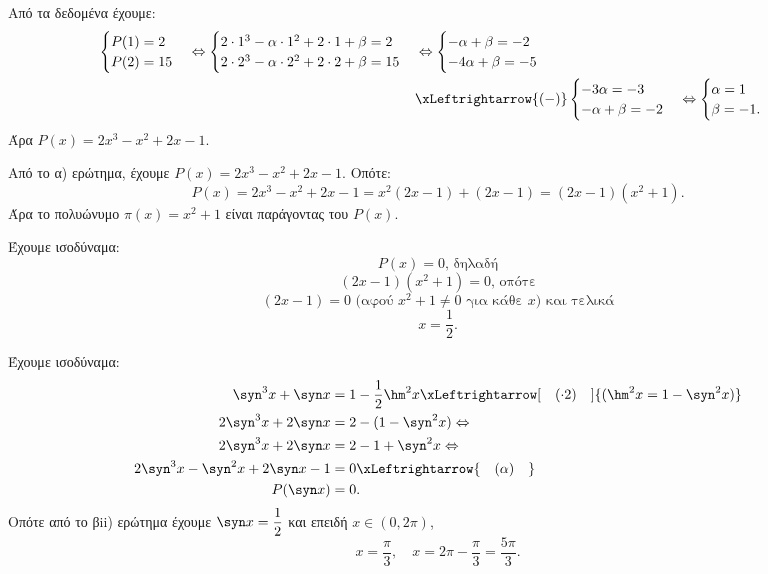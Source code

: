 \begin{alist}
\item Από τα δεδομένα έχουμε:
\begin{align*}
\begin{cases} P(1) = 2 \\ P(2) = 15 \end{cases} \Leftrightarrow \begin{cases} 2\cdot 1^3 - \alpha \cdot 1^2 + 2\cdot 1 + \beta = 2 \\ 2\cdot 2^3 - \alpha \cdot 2^2 + 2\cdot 2 + \beta = 15 \end{cases} &\Leftrightarrow \begin{cases} -\alpha + \beta = -2 \\ -4\alpha + \beta = -5 \end{cases} \\
&\xLeftrightarrow{(-)} \begin{cases} -3\alpha = -3 \\ -\alpha + \beta = -2 \end{cases} \Leftrightarrow \begin{cases} \alpha = 1 \\ \beta = -1. \end{cases}
\end{align*}
Άρα $P(x) = 2x^3 - x^2 + 2x - 1$.
\item 
\begin{rlist}
\item Από το α) ερώτημα, έχουμε $P(x) = 2x^3 - x^2 + 2x - 1$. Οπότε:
\[P(x) = 2x^3 - x^2 + 2x - 1 = x^2(2x-1) + (2x-1) = (2x-1)(x^2+1).\]
Άρα το πολυώνυμο $\pi(x) = x^2+1$ είναι παράγοντας του $P(x)$.
\item Έχουμε ισοδύναμα:
\[P(x) = 0 \text{, δηλαδή}\]
\[(2x-1)(x^2+1) = 0 \text{, οπότε}\]
\[(2x-1) = 0 \text{ (αφού } x^2+1 \ne 0 \text{ για κάθε } x) \text{ και τελικά}\]
\[x = \frac{1}{2}.\]
\end{rlist}
\item Έχουμε ισοδύναμα:
\begin{align*}
\syn ^3x + \syn  x &= 1 - \frac{1}{2}\hm ^2x \xLeftrightarrow[\quad (\cdot 2) \quad]{(\hm ^2x = 1 - \syn ^2x)} \\
2\syn ^3x + 2\syn  x &= 2 - (1 - \syn ^2x) \Leftrightarrow \\
2\syn ^3x + 2\syn  x &= 2 - 1 + \syn ^2x \Leftrightarrow \\
2\syn ^3x - \syn ^2x + 2\syn  x - 1 &= 0 \xLeftrightarrow{\quad (\alpha) \quad} \\
P(\syn  x) &= 0.
\end{align*}
Οπότε από το βii) ερώτημα έχουμε $\syn  x = \dfrac{1}{2}$ και επειδή $x \in (0, 2\pi)$,
\[x = \frac{\pi}{3}, \quad x = 2\pi - \frac{\pi}{3} = \frac{5\pi}{3}.\]
\end{alist}

